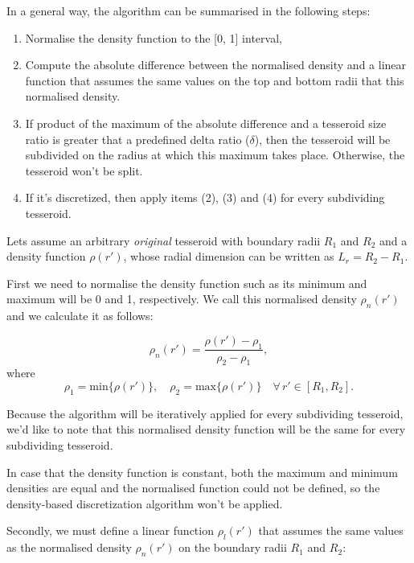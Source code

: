 \documentclass[extra]{gji}
\begin{document}
In a general way, the algorithm can be summarised in the following steps:

\begin{enumerate}
\renewcommand{\theenumi}{(\arabic{enumi})}
    \item Normalise the density function to the [0, 1] interval,
    \item Compute the absolute difference between the normalised 
          density and a linear function that assumes the same values on the 
          top and bottom radii that this normalised density.
    \item If product of the maximum of the absolute difference and a 
          tesseroid size ratio is greater that a predefined delta ratio 
          ($\delta$), then the tesseroid will be subdivided on the 
          radius at which this maximum takes place. Otherwise, the 
          tesseroid won't be split.
    \item If it's discretized, then apply items (2), (3) and (4) for 
          every subdividing tesseroid.
\end{enumerate}

Lets assume an arbitrary \emph{original} tesseroid with boundary radii 
$R_1$ and $R_2$ and a density function $\rho(r')$, whose radial 
dimension can be written as $L_r = R_2 - R_1$.

First we need to normalise the density function such as its minimum and 
maximum will be 0 and 1, respectively.
We call this normalised density $\rho_n(r')$ and we calculate it as 
follows:

\begin{equation}
    \rho_n(r') = \frac{\rho(r') - \rho_1}{\rho_2 - \rho_1},
\end{equation}
\noindent where
\begin{equation}
    \rho_1 = \text{min}\{ \rho(r') \}, \quad
    \rho_2 = \text{max}\{ \rho(r') \} \quad
    \forall \, r' \in [R_1, R_2].
\end{equation}

Because the algorithm will be iteratively applied for every 
subdividing tesseroid, we'd like to note that this normalised density 
function will be the same for every subdividing tesseroid.

In case that the density function is constant, both the maximum and 
minimum densities are equal and the normalised function could not 
be defined, so the density-based discretization algorithm won't be 
applied.

Secondly, we must define a linear function $\rho_l(r')$ that assumes 
the same values as the normalised density $\rho_n(r')$ on the boundary 
radii $R_1$ and $R_2$:
\end{document}
